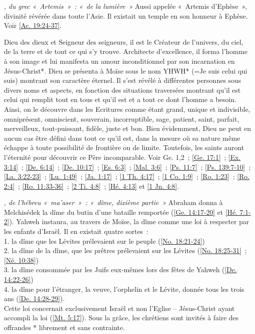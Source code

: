 \begin{multicols}{2}
\textit{, du grec «~Artemis~»~: «~de la lumière~»}\newline
Aussi appelée «~Artemis d'Ephèse~», divinité révérée dans toute l'Asie. Il existait un temple en son honneur à Ephèse. Voir \vref{Ac. 19:24-37}.

\textit{}\newline
Dieu des dieux et Seigneur des seigneurs, il est le Créateur de l'univers, du ciel, de la terre et de tout ce qui s'y trouve. Architecte d'excellence, il forma l'homme à son image et lui manifesta un amour inconditionnel par son incarnation en Jésus-Christ*. Dieu se présenta à Moïse sous le nom YHWH* (=Je suis celui qui suis) montrant son caractère éternel. Il s'est révélé à différentes personnes sous divers noms et aspects, en fonction des situations traversées montrant qu'il est celui qui remplit tout en tous et qu'il est et a tout ce dont l'homme a besoin. Ainsi, on le découvre dans les Ecritures comme étant grand, unique et indivisible, omniprésent, omniscient, souverain, incorruptible, sage, patient, saint, parfait, merveilleux, tout-puissant, fidèle, juste et bon. Bien évidemment, Dieu ne peut en aucun cas être défini dans tout ce qu'il est, dans la mesure où sa nature même échappe à toute possibilité de frontière ou de limite. Toutefois, les saints auront l'éternité pour découvrir ce Père incomparable. Voir Ge. 1,2~; \vref{Ge. 17:1}~; \vref{Ex. 3:14}~; \vref{De. 6:14}~; \vref{De. 10:17}~; \vref{Es. 6:3}~; \vref{Mal. 3:6}~; \vref{Ps. 11:7}~; \vref{Ps. 139:7-10}~; \vref{La. 3:22-23}~; \vref{Lu. 1:49}~; \vref{Ja. 1:17}~; \vref{1 Th. 4:17}~; \vref{1 Co. 1:9}~; \vref{Ro. 1:23}~; \vref{Ro. 2:4}~; \vref{Ro. 11:33-36}~; \vref{2 Ti. 4:8}~; \vref{Hé. 4:13} et \vref{1 Jn. 4:8}.

\textit{, de l'hébreu «~ma'aser~»~: «~dîme, dixième partie~»}\newline
Abraham donna à Melchisédek la dîme du butin d'une bataille remportée (\vref{Ge. 14:17-20} et \vref{Hé. 7:1-2}). Yahweh instaura, au travers de Moïse, la dîme comme une loi à respecter par les enfants d'Israël. Il en existait quatre sortes~:
\\1. la dîme que les Lévites prélevaient sur le peuple (\vref{No. 18:21-24})
\\2. la dîme de la dîme, que les prêtres prélevaient sur les Lévites (\vref{No. 18:25-31}~; \vref{Né. 10:38})
\\3. la dîme consommée par les Juifs eux-mêmes lors des fêtes de Yahweh (\vref{De. 14:22-26})
\\4. la dîme pour l'étranger, la veuve, l'orphelin et le Lévite, donnée tous les trois ans (\vref{De. 14:28-29}).
\\Cette loi concernait exclusivement Israël et non l'Eglise – Jésus-Christ ayant accompli la loi (\vref{Mt. 5:17}). Sous la grâce, les chrétiens sont invités à faire des offrandes * librement et sans contrainte.


\end{multicols}
